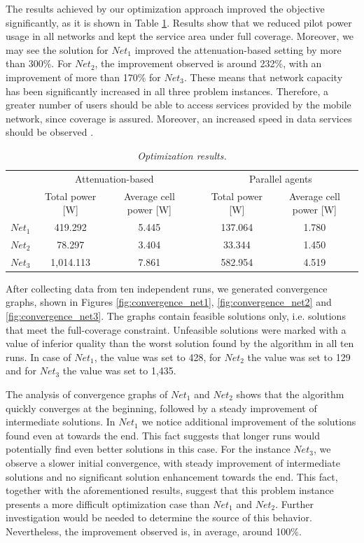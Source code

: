 The results achieved by our optimization approach improved the objective
significantly, as it is shown in Table \ref{tab:optimization-results-1}.
Results show that we reduced pilot power usage in all networks and
kept the service area under full coverage. Moreover, we may see the
solution for $Net_{1}$ improved the attenuation-based setting by
more than 300\%. For $Net_{2}$, the improvement observed is around
232\%, with an improvement of more than 170\% for $Net_{3}$. These
means that network capacity has been significantly increased in all
three problem instances. Therefore, a greater number of users should
be able to access services provided by the mobile network, since coverage
is assured. Moreover, an increased speed in data services should be
observed \cite{Holma_WCDMA.for.UMTS:2005}.

\begin{table}
\caption{\textit{Optimization results.\label{tab:optimization-results-1}}}


\centering

\begin{tabular}{cccccc}
\toprule 
 & \multicolumn{2}{c}{Attenuation-based} &  & \multicolumn{2}{c}{Parallel agents}\tabularnewline\addlinespace
\cmidrule{2-3} \cmidrule{5-6} 
 & Total power {[}W{]} & Average cell power {[}W{]} &  & Total power {[}W{]} & Average cell power {[}W{]}\tabularnewline\addlinespace
\cmidrule{1-3} \cmidrule{5-6} 
$Net_{1}$ & 419.292 & 5.445 &  & 137.064 & 1.780\tabularnewline
$Net_{2}$ & 78.297 & 3.404 &  & 33.344 & 1.450\tabularnewline
$Net_{3}$ & 1,014.113 & 7.861 &  & 582.954 & 4.519\tabularnewline
\bottomrule
\end{tabular}
\end{table}


After collecting data from ten independent runs, we generated convergence
graphs, shown in Figures \ref{fig:convergence_net1}, \ref{fig:convergence_net2}
and \ref{fig:convergence_net3}. The graphs contain feasible solutions
only, i.e. solutions that meet the full-coverage constraint. Unfeasible
solutions were marked with a value of inferior quality than the worst
solution found by the algorithm in all ten runs. In case of $Net_{1}$,
the value was set to 428, for $Net_{2}$ the value was set to 129
and for $Net_{3}$ the value was set to 1,435. 

The analysis of convergence graphs of $Net_{1}$ and $Net_{2}$ shows
that the algorithm quickly converges at the beginning, followed by
a steady improvement of intermediate solutions. In $Net_{1}$ we notice
additional improvement of the solutions found even at towards the
end. This fact suggests that longer runs would potentially find even
better solutions in this case. For the instance $Net_{3}$, we observe
a slower initial convergence, with steady improvement of intermediate
solutions and no significant solution enhancement towards the end.
This fact, together with the aforementioned results, suggest that
this problem instance presents a more difficult optimization case
than $Net_{1}$ and $Net_{2}$. Further investigation would be needed
to determine the source of this behavior. Nevertheless, the improvement
observed is, in average, around 100\%.


